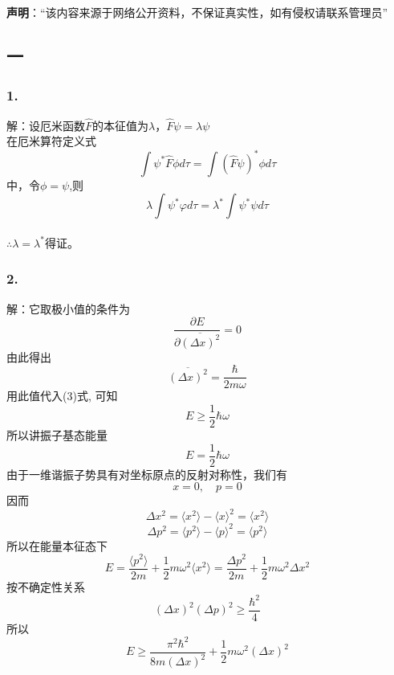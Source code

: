 
\textbf{声明}：“该内容来源于网络公开资料，不保证真实性，如有侵权请联系管理员”

\subsection{一}
\subsubsection{1.}
解：设厄米函数$\hat{F}$的本征值为$\lambda$，$\hat{F}\psi = \lambda \psi$\\
在厄米算符定义式$$\int \psi^* \hat{F} \phi d\tau = \int (\hat{F} \psi)^* \phi d\tau~$$中，令$\phi=\psi$,则$$\lambda \int \psi^* \varphi d\tau = \lambda^* \int \psi^* \psi d\tau~$$\\
$\therefore \lambda=\lambda^*$得证。
\subsubsection{2.}
解：它取极小值的条件为
$$\frac{\partial E}{\partial \overline{(\Delta x)^2}} = 0~$$
由此得出
$$\overline{(\Delta x)^2} = \frac{\hbar}{2 m \omega}~$$
用此值代入(3)式, 可知
$$E \geq \frac{1}{2} \hbar \omega~$$
所以讲振子基态能量
$$E = \frac{1}{2} \hbar \omega~$$
由于一维谐振子势具有对坐标原点的反射对称性，我们有
$$ x = 0, \quad  p = 0~$$
因而
$$ \Delta x^2 = \langle x^2 \rangle - \langle x \rangle^2 = \langle x^2 \rangle~ $$
$$ \Delta p^2 = \langle p^2 \rangle - \langle p \rangle^2 = \langle p^2 \rangle~ $$
所以在能量本征态下
$$ E = \frac{\langle p^2 \rangle}{2m} + \frac{1}{2} m \omega^2 \langle x^2 \rangle = \frac{\Delta p^2}{2m} + \frac{1}{2} m \omega^2 \Delta x^2~$$
按不确定性关系
$$ (\Delta x)^2 (\Delta p)^2 \geq \frac{\hbar^2}{4}~$$
所以
$$ E \geq \frac{\pi^2 \hbar^2}{8m (\Delta x)^2} + \frac{1}{2} m \omega^2 (\Delta x)^2~$$

